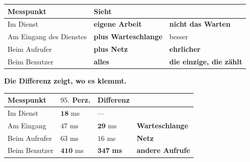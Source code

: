 \begin{merksatz}
\begin{center}
{\small
\renewcommand{\arraystretch}{1.5}
\begin{tabular}{@{}P{3.0cm}P{2.4cm}P{2.6cm}@{}}
\toprule
\textbf{Messpunkt} & \textbf{Sieht} & \\
\midrule
Im Dienst & \textbf{eigene Arbeit} & \textcolor{akzent}{\textbf{nicht das Warten}}\\
Am Eingang des Dienstes & \textbf{plus Warteschlange} & \textcolor{gruen}{besser}\\
Beim Aufrufer & \textbf{plus Netz} & \textcolor{gruen}{\textbf{ehrlicher}}\\
Beim Benutzer & \textbf{alles} & \textcolor{gruen}{\textbf{die einzige, die zählt}}\\
\bottomrule
\end{tabular}}
\end{center}

\begin{center}
\begin{minipage}{0.88\textwidth}
\end{minipage}
\end{center}

\textbf{Die Differenz zeigt, wo es klemmt.}

\begin{center}
\renewcommand{\arraystretch}{1.45}
\begin{tabular}{@{}P{2.8cm}P{2.2cm}P{2.4cm}P{1.8cm}@{}}
\toprule
\textbf{Messpunkt} & \textbf{$95.$ Perz.} & \textbf{Differenz} & \\
\midrule
Im Dienst & $\mathbf{18}$ ms & --- & \\
Am Eingang & $47$ ms & $\mathbf{29}$ ms & \textcolor{akzent}{\textbf{Warte\-schlange}}\\
Beim Aufrufer & $63$ ms & $16$ ms & \textbf{Netz}\\
Beim Benutzer & $\mathbf{410}$ ms & \textcolor{akzent}{$\mathbf{347}$ \textbf{ms}} & \textcolor{akzent}{\textbf{andere Aufrufe}}\\
\bottomrule
\end{tabular}
\end{center}

\begin{center}
\end{center}


\end{merksatz}
